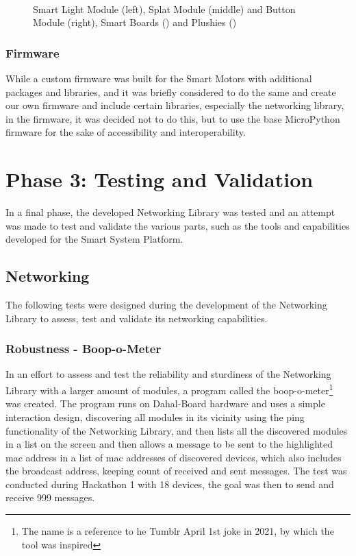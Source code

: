 \begin{figure}[H]
\begin{subfigure}[b]{0.25\textwidth}
    \end{subfigure}
    \\\vspace{\ftspace}
    \caption{Smart Light Module (left), Splat Module (middle) and Button Module (right), Smart Boards () and Plushies () \citep{jess_smart_2025}}
    \label{fig:hardware_examples}
\end{figure}

\subsubsection{\label{sec:methods_fw}Firmware}
While a custom firmware was built for the Smart Motors with additional packages and libraries, and it was briefly considered to do the same and create our own firmware and include certain libraries, especially the networking library, in the firmware, it was decided not to do this, but to use the base MicroPython firmware for the sake of accessibility and interoperability.

\section{\label{sec:methods_ph3}Phase 3: Testing and Validation}
In a final phase, the developed Networking Library was tested and an attempt was made to test and validate the various parts, such as the tools and capabilities developed for the Smart System Platform.

\subsection{\label{sec:methods_test_net}Networking}
The following tests were designed during the development of the Networking Library to assess, test and validate its networking capabilities.

\subsubsection{\label{sec:methods_test_boop}Robustness - Boop-o-Meter}
In an effort to assess and test the reliability and sturdiness of the Networking Library with a larger amount of modules, a program called the boop-o-meter\footnote{The name is a reference to he Tumblr April 1st joke in 2021, by which the tool was inspired} was created. The program runs on Dahal-Board hardware and uses a simple interaction design, discovering all modules in its vicinity using the ping functionality of the Networking Library, and then lists all the discovered modules in a list on the screen and then allows a message to be sent to the highlighted mac address in a list of mac addresses of discovered devices, which also includes the broadcast address, keeping count of received and sent messages. The test was conducted during Hackathon 1 with 18 devices, the goal was then to send and receive 999 messages.

